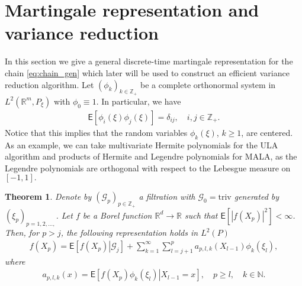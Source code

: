 \documentclass[aap,preprint]{imsart}
\newtheorem{thm}{Theorem}
\begin{document}
\section{Martingale representation and variance reduction}
\label{seq:mart_repr}
In this section we give a general discrete-time martingale representation for the chain \eqref{eq:chain_gen} which later will be used to construct an efficient variance reduction algorithm. Let \((\phi_k)_{k\in \mathbb{Z}_+}\) be a complete orthonormal system in \(L^2(\mathbb{R}^m, P_{\xi})\) with \(\phi_0\equiv 1\). In particular, we have
\begin{eqnarray*}
\mathsf{E}[\phi_i(\xi)\phi_j(\xi)]=\delta_{ij},\quad i,j\in  \mathbb{Z}_{+}.
\end{eqnarray*}
Notice that this implies that the random variables
$\phi_k(\xi)$, $k\ge1$, are centered. As an example, we can take  multivariate Hermite polynomials for the ULA algorithm and products of Hermite and Legendre polynomials for MALA, as the Legendre polynomials are orthogonal with respect to the Lebesgue measure on \([-1,1].\)
\begin{thm}\label{prop:29032018a1}
Denote by $(\mathcal{G}_p)_{p\in \mathbb{Z}_+}$  a filtration
with $\mathcal{G}_0=\mathrm{triv}$
generated by $(\xi_p)_{p=1,2,\ldots,}$. Let $f$ be a Borel function $\mathbb{R}^{d}\to\mathbb R$ such that
$\mathsf{E}\left[\left|f(X_{p})\right|^{2}\right]<\infty$. Then,
for $p>j$, the following representation holds in \(L^2(P)\)
\begin{eqnarray}
\label{eq:mart_repr}
f(X_{p})=\mathsf{E}\left[\left.f(X_{p})\right|\mathcal G_{j}\right]+\sum_{k=1}^{\infty}\sum_{l=j+1}^{p}a_{p,l,k}(X_{l-1})\phi_k\left(\xi_{l}\right),
\end{eqnarray}
where
\begin{eqnarray}
\label{eq:coeff_mart}
a_{p,l,k}(x)=\mathsf{E}\left[\left.f(X_{p})\phi_k\left(\xi_{l}\right)\right|X_{l-1}=x\right], \quad p\geq l, \quad k\in \mathbb{N}.
\end{eqnarray}
\end{thm}
\end{document}
